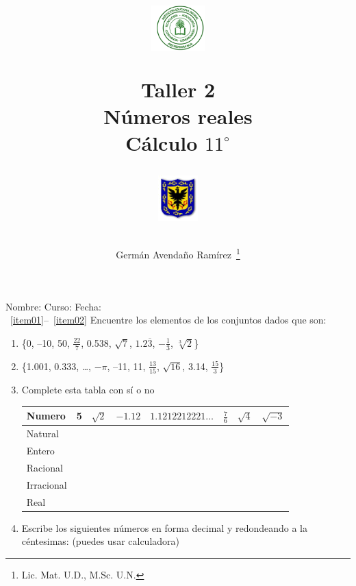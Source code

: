 \documentclass[10pt,twoside]{article}
\author{Germ\'an Avenda\~no Ram\'irez~\thanks{Lic. Mat. U.D., M.Sc. U.N.}}
\title{\begin{minipage}{.2\textwidth}
\includegraphics[height=1.75cm]{Images/logo-colegio.png}\end{minipage}
\begin{minipage}{.55\textwidth}
\begin{center}
Taller 2\\
Números reales\\
Cálculo $11^{\circ}$
\end{center}
\end{minipage}\hfill
\begin{minipage}{.2\textwidth}
\includegraphics[height=1.75cm]{Images/logo-sed.png} 
\end{minipage}}
\date{}
\begin{document}
\maketitle
Nombre: \hrulefill Curso: \underline{\hspace*{44pt}} Fecha: \underline{\hspace*{2.5cm}}\\

~\ref{item01}--~\ref{item02} Encuentre los elementos de los conjuntos dados que son:
\begin{enumerate}
\item \{0, --10, 50, $\frac{22}{7}$, 0.538, $\sqrt{7}$, $1.2\overline{3}$, $-\frac{1}{3}$, $\sqrt[3]{2}$\}\label{item01}
\item \{1.001, 0.333, \ldots, $-\pi$, --11, 11, $\frac{13}{15}$, $\sqrt{16}$, 3.14, $\frac{15}{3}$\}\label{item02}
\begin{enumerate}
\end{enumerate}
  \item Complete esta tabla con sí o no
  \begin{center}
  \begin{tabular}{|l|c|c|c|c|c|c|c|}
\hline 
Numero & 5 & $\sqrt{2}$ & $-1.12$ & $1.1212212221\ldots$ & $\frac{7}{6}$ & $\sqrt{4}$ & $\sqrt{-3}$ \\ 
\hline 
Natural &  &  &  &  &  &  &  \\ 
\hline 
Entero &  &  &  &  &  &  &  \\ 
\hline 
Racional &  &  &  &  &  &  &  \\ 
\hline 
Irracional &  &  &  &  &  &  &  \\ 
\hline 
Real &  &  &  &  &  &  &  \\ 
\hline 
\end{tabular} 
  \end{center}
    \item Escribe los siguientes números en forma decimal y redondeando a la céntesimas: (puedes usar calculadora)
  \begin{enumerate}
\end{enumerate}
\end{enumerate}
\end{document}
